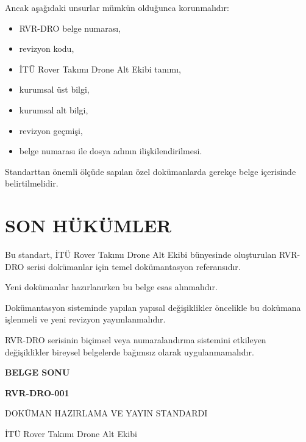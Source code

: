 \documentclass[11pt,a4paper]{article}
\newcommand{\BelgeNo}{RVR-DRO-001}
\newcommand{\BelgeAdi}{DOKÜMAN HAZIRLAMA VE YAYIN STANDARDI}
\begin{document}
Ancak aşağıdaki unsurlar mümkün olduğunca korunmalıdır:

\begin{itemize}
    \item RVR-DRO belge numarası,
    \item revizyon kodu,
    \item İTÜ Rover Takımı Drone Alt Ekibi tanımı,
    \item kurumsal üst bilgi,
    \item kurumsal alt bilgi,
    \item revizyon geçmişi,
    \item belge numarası ile dosya adının ilişkilendirilmesi.
\end{itemize}

Standarttan önemli ölçüde sapılan özel dokümanlarda gerekçe belge
içerisinde belirtilmelidir.


\newpage

\section{SON HÜKÜMLER}

Bu standart, İTÜ Rover Takımı Drone Alt Ekibi bünyesinde oluşturulan
RVR-DRO serisi dokümanlar için temel dokümantasyon referansıdır.

Yeni dokümanlar hazırlanırken bu belge esas alınmalıdır.

Dokümantasyon sisteminde yapılan yapısal değişiklikler öncelikle
bu dokümana işlenmeli ve yeni revizyon yayımlanmalıdır.

RVR-DRO serisinin biçimsel veya numaralandırma sistemini etkileyen
değişiklikler bireysel belgelerde bağımsız olarak uygulanmamalıdır.


\newpage

\begin{center}

\vspace*{\fill}

{\Large\bfseries BELGE SONU}

\vspace{5mm}

{\bfseries \BelgeNo}

\vspace{2mm}

{\BelgeAdi}

\vspace{6mm}

{\small İTÜ Rover Takımı Drone Alt Ekibi}

\vspace*{\fill}

\end{center}
\end{document}
